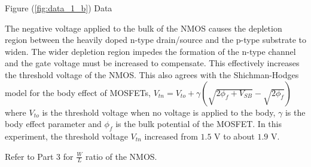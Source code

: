 \FloatBarrier

\begin{table}[h!]
	\centering
	\caption{Figure (\ref{fig:data_1_b}) Data}
	\label{tab:data_1_b}
\end{table}

\FloatBarrier

The negative voltage applied to the bulk of the NMOS causes the depletion region between the heavily doped n-type drain/source and the p-type substrate to widen. 
The wider depletion region impedes the formation of the n-type channel and the gate voltage must be increased to compensate.
This effectively increases the threshold voltage of the NMOS.
This also agrees with the Shichman-Hodges model for the body effect of MOSFETs, $V_{tn} = V_{to} + \gamma(\sqrt{2\phi_f + V_{SB}} - \sqrt{2\phi_f})$ where $V_{to}$ is the threshold voltage when no voltage is applied to the body, $\gamma$ is the body effect parameter and $\phi_f$ is the bulk potential of the MOSFET.
In this experiment, the threshold voltage $V_{tn}$ increased from $1.5$ \si{\volt} to about $1.9$ \si{\volt}.

Refer to Part 3 for $\frac{W}{L}$ ratio of the NMOS.
